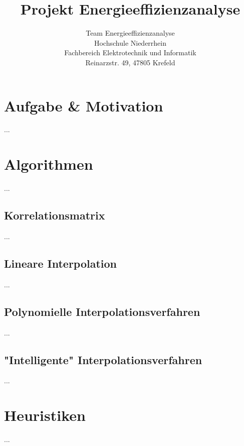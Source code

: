 \documentclass[11pt,a4paper,twocolumn]{article}
\title{\vspace*{-10mm}Projekt Energieeffizienzanalyse}
\author{
Team Energieeffizienzanalyse\\
Hochschule Niederrhein\\
Fachbereich Elektrotechnik und Informatik\\
Reinarzstr. 49, 47805 Krefeld
}
\date{}
\begin{document}
\renewcommand{\labelenumi}{\arabic{enumi})}


\thispagestyle{firstpage}

\section{Aufgabe \& Motivation}
...

\section{Algorithmen}
...

\subsection{Korrelationsmatrix}
...

\subsection{Lineare Interpolation}
...

\subsection{Polynomielle Interpolationsverfahren}
...

\subsection{"Intelligente" Interpolationsverfahren}
...

\section{Heuristiken}
...
\end{document}
